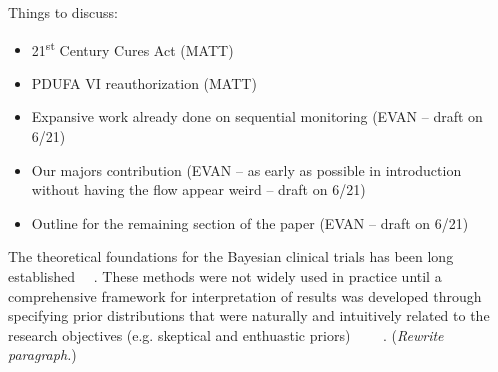 \documentclass[12pt]{article}
\begin{document}
Things to discuss:
\begin{itemize}
 \item 21\textsuperscript{st} Century Cures Act (MATT)
 \item PDUFA VI reauthorization (MATT)
 \item Expansive work already done on sequential monitoring  (EVAN -- draft on 6/21)
 \item Our majors contribution (EVAN -- as early as possible in introduction without having the flow appear weird -- draft on 6/21)
 \item Outline for the remaining section of the paper (EVAN -- draft on 6/21)
\end{itemize}
The theoretical foundations for the Bayesian clinical trials has been long established \cite{Cornfield1966}~\cite{Cornfield1966a}~\cite{Neyman1967}. These methods were not widely used in practice until a comprehensive framework for interpretation of results was developed through specifying prior distributions that were naturally and intuitively related to the research objectives (e.g. skeptical and enthuastic priors) \cite{Freedman1989}~\cite{Freedman1992}~\cite{Spiegelhalter1993}~\cite{Spiegelhalter1994}~\cite{Fayers1997}. (\textit{Rewrite paragraph.})
\end{document}
